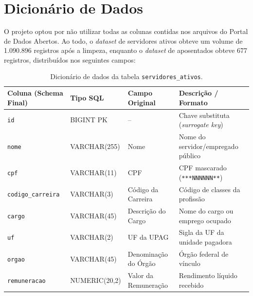 \documentclass[12pt,a4paper]{article}
\begin{document}
\section{Dicionário de Dados}

O projeto optou por não utilizar todas as colunas contidas nos arquivos do Portal de Dados Abertos. Ao todo, o \textit{dataset} de servidores ativos obteve um volume de 1.090.896 registros após a limpeza, enquanto o \textit{dataset} de aposentados obteve 677 registros, distribuídos nos seguintes campos:

\begin{table}[H]
\centering
\caption{Dicionário de dados da tabela \texttt{servidores\_ativos}.}
\label{tab:dicionario_ativos}
\small
\setlength{\tabcolsep}{4pt}
\begin{tabularx}{\textwidth}{l l l X}
\toprule
\textbf{Coluna (Schema Final)} & \textbf{Tipo SQL} & \textbf{Campo Original} & \textbf{Descrição / Formato} \\
\midrule
\texttt{id} & BIGINT PK & -- & Chave substituta (\textit{surrogate key}) \\
\texttt{nome} & VARCHAR(255) & Nome & Nome do servidor/empregado público \\
\texttt{cpf} & VARCHAR(11) & CPF & CPF mascarado (\texttt{***NNNNNN**}) \\
\texttt{codigo\_carreira} & VARCHAR(3) & Código da Carreira & Código de classes da profissão \\
\texttt{cargo} & VARCHAR(45) & Descrição do Cargo & Nome do cargo ou emprego ocupado \\
\texttt{uf} & VARCHAR(2) & UF da UPAG & Sigla da UF da unidade pagadora \\
\texttt{orgao} & VARCHAR(45) & Denominação do Órgão & Órgão federal de vínculo \\
\texttt{remuneracao} & NUMERIC(20,2) & Valor da Remuneração & Rendimento líquido recebido \\
\bottomrule
\end{tabularx}
\end{table}
\end{document}
